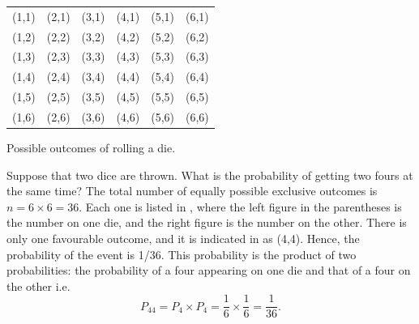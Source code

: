 \begin{marginfigure}[-1cm]
\begin{footnotesize}
\centering
\setlength\arrayrulewidth{1.25pt}
\begin{tabular}{gggggg}
\hline
(1,1) & (2,1) & (3,1) & (4,1) & (5,1) & (6,1) \\
(1,2) & (2,2) & (3,2) & (4,2) & (5,2) & (6,2) \\
(1,3) & (2,3) & (3,3) & (4,3) & (5,3) & (6,3) \\
(1,4) & (2,4) & (3,4) & (4,4) & (5,4) & (6,4) \\
(1,5) & (2,5) & (3,5) & (4,5) & (5,5) & (6,5) \\
(1,6) & (2,6) & (3,6) & (4,6) & (5,6) & (6,6) \\
\hline
\end{tabular}
\caption{Possible outcomes of rolling a die.\label{die-table}}
\end{footnotesize}
\end{marginfigure}

Suppose that two dice are thrown. What is the probability of getting
two fours at the same time? The total number of equally possible
exclusive outcomes is $n = 6 \times 6 = 36$. Each one is listed in , where the left figure in the parentheses is the number on one die, and the right figure is the number on the other. There is only one favourable outcome, and it is indicated in  as (4,4). Hence, the probability of the event is 1/36. This probability is the product of two probabilities: the probability of a four appearing on one die and that of a four on
the other i.e. 
\begin{equation*}%
P_{44} = P_{4} \times P_{4} = \frac{1}{6} \times \frac{1}{6} = \frac{1}{36}.
\end{equation*}

